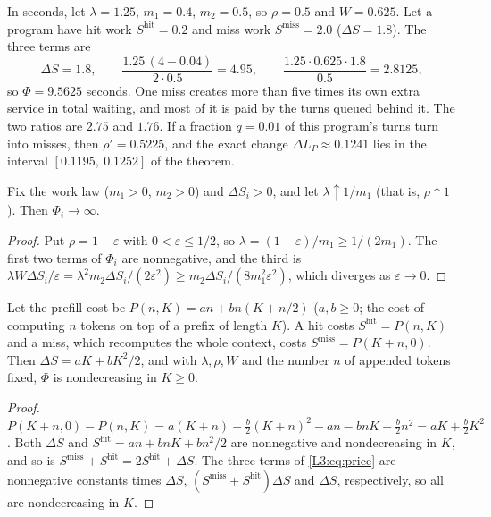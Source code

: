 \begin{example}\label{L3:ex:price}
In seconds, let $\lambda=1.25$, $m_1=0.4$, $m_2=0.5$, so $\rho=0.5$ and $W=0.625$.
Let a program have hit work $S^{\mathrm{hit}}=0.2$ and miss work
$S^{\mathrm{miss}}=2.0$ ($\Delta S=1.8$). The three terms are
\[
  \Delta S=1.8,\qquad \frac{1.25\,(4-0.04)}{2\cdot0.5}=4.95,\qquad
  \frac{1.25\cdot0.625\cdot1.8}{0.5}=2.8125,
\]
so $\Phi=9.5625$ seconds. One miss creates more than five times its own extra
service in total waiting, and most of it is paid by the turns queued behind it.
The two ratios are $2.75$ and $1.76$. If a fraction $q=0.01$ of this program's
turns turn into misses, then $\rho'=0.5225$, and the exact change
$\Delta L_P\approx0.1241$ lies in the interval $[0.1195,\ 0.1252]$ of the theorem.
\end{example}

\begin{corollary}\label{cor:price-diverge}
Fix the work law ($m_1>0$, $m_2>0$) and $\Delta S_i>0$, and let
$\lambda\uparrow1/m_1$ (that is, $\rho\uparrow1$). Then $\Phi_i\to\infty$.
\end{corollary}

\begin{proof}
Put $\rho=1-\varepsilon$ with $0<\varepsilon\le1/2$, so
$\lambda=(1-\varepsilon)/m_1\ge1/(2m_1)$. The first two terms of $\Phi_i$ are
nonnegative, and the third is
$\lambda W\Delta S_i/\varepsilon=\lambda^2m_2\Delta S_i/(2\varepsilon^2)\ge m_2\Delta S_i/(8m_1^2\varepsilon^2)$,
which diverges as $\varepsilon\to0$.
\end{proof}

\begin{corollary}\label{cor:price-mono}
Let the prefill cost be $P(n,K)=an+bn(K+n/2)$ ($a,b\ge0$; the cost of computing
$n$ tokens on top of a prefix of length $K$). A hit costs
$S^{\mathrm{hit}}=P(n,K)$ and a miss, which recomputes the whole context, costs
$S^{\mathrm{miss}}=P(K+n,0)$. Then $\Delta S=aK+bK^2/2$, and with $\lambda,\rho,W$
and the number $n$ of appended tokens fixed, $\Phi$ is nondecreasing in $K\ge0$.
\end{corollary}

\begin{proof}
$P(K+n,0)-P(n,K)=a(K+n)+\tfrac b2(K+n)^2-an-bnK-\tfrac b2n^2=aK+\tfrac b2K^2$.
Both $\Delta S$ and $S^{\mathrm{hit}}=an+bnK+bn^2/2$ are nonnegative and
nondecreasing in $K$, and so is
$S^{\mathrm{miss}}+S^{\mathrm{hit}}=2S^{\mathrm{hit}}+\Delta S$. The three terms of
\cref{L3:eq:price} are nonnegative constants times $\Delta S$,
$(S^{\mathrm{miss}}+S^{\mathrm{hit}})\Delta S$ and $\Delta S$, respectively, so all
are nondecreasing in $K$.
\end{proof}

